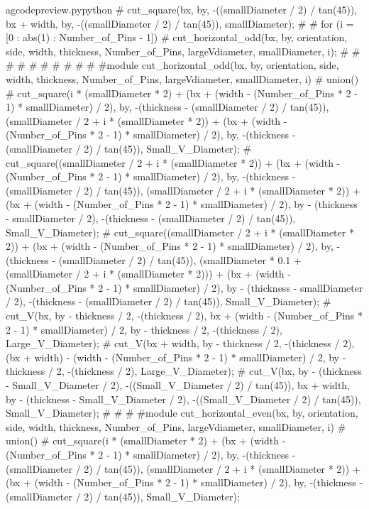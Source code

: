 \documentclass{ltxdoc}
\begin{document}
\begin{writecode}{a}{gcodepreview.py}{python}
{{{{{{#            cut_square(bx, by, -((smallDiameter / 2) / tan(45)), bx + width, by, -((smallDiameter / 2) / tan(45)), smallDiameter);
#          }
#          for (i = [0 : abs(1) : Number_of_Pins - 1]) {
#            cut_horizontal_odd(bx, by, orientation, side, width, thickness, Number_of_Pins, largeVdiameter, smallDiameter, i);
#          }
#
#        }
#      }
#
#    }
#  }
#
#}
#
#module cut_horizontal_odd(bx, by, orientation, side, width, thickness, Number_of_Pins, largeVdiameter, smallDiameter, i) {
#  union(){
#    cut_square(i * (smallDiameter * 2) + (bx + (width - (Number_of_Pins * 2 - 1) * smallDiameter) / 2), by, -(thickness - (smallDiameter / 2) / tan(45)), (smallDiameter / 2 + i * (smallDiameter * 2)) + (bx + (width - (Number_of_Pins * 2 - 1) * smallDiameter) / 2), by, -(thickness - (smallDiameter / 2) / tan(45)), Small_V_Diameter);
#    cut_square((smallDiameter / 2 + i * (smallDiameter * 2)) + (bx + (width - (Number_of_Pins * 2 - 1) * smallDiameter) / 2), by, -(thickness - (smallDiameter / 2) / tan(45)), (smallDiameter / 2 + i * (smallDiameter * 2)) + (bx + (width - (Number_of_Pins * 2 - 1) * smallDiameter) / 2), by - (thickness - smallDiameter / 2), -(thickness - (smallDiameter / 2) / tan(45)), Small_V_Diameter);
#    cut_square((smallDiameter / 2 + i * (smallDiameter * 2)) + (bx + (width - (Number_of_Pins * 2 - 1) * smallDiameter) / 2), by, -(thickness - (smallDiameter / 2) / tan(45)), (smallDiameter * 0.1 + (smallDiameter / 2 + i * (smallDiameter * 2))) + (bx + (width - (Number_of_Pins * 2 - 1) * smallDiameter) / 2), by - (thickness - smallDiameter / 2), -(thickness - (smallDiameter / 2) / tan(45)), Small_V_Diameter);
#    cut_V(bx, by - thickness / 2, -(thickness / 2), bx + (width - (Number_of_Pins * 2 - 1) * smallDiameter) / 2, by - thickness / 2, -(thickness / 2), Large_V_Diameter);
#    cut_V(bx + width, by - thickness / 2, -(thickness / 2), (bx + width) - (width - (Number_of_Pins * 2 - 1) * smallDiameter) / 2, by - thickness / 2, -(thickness / 2), Large_V_Diameter);
#    cut_V(bx, by - (thickness - Small_V_Diameter / 2), -((Small_V_Diameter / 2) / tan(45)), bx + width, by - (thickness - Small_V_Diameter / 2), -((Small_V_Diameter / 2) / tan(45)), Small_V_Diameter);
#  }
#}
#
#module cut_horizontal_even(bx, by, orientation, side, width, thickness, Number_of_Pins, largeVdiameter, smallDiameter, i) {
#  union(){
#    cut_square(i * (smallDiameter * 2) + (bx + (width - (Number_of_Pins * 2 - 1) * smallDiameter) / 2), by, -(thickness - (smallDiameter / 2) / tan(45)), (smallDiameter / 2 + i * (smallDiameter * 2)) + (bx + (width - (Number_of_Pins * 2 - 1) * smallDiameter) / 2), by, -(thickness - (smallDiameter / 2) / tan(45)), Small_V_Diameter);
}}
\end{writecode}
\end{document}
